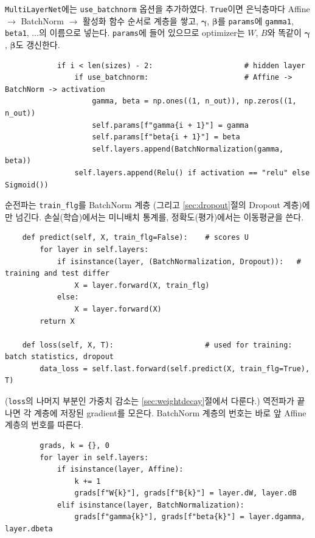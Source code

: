 \documentclass[11pt,a4paper]{article}
\begin{document}
\texttt{MultiLayerNet}에는 \texttt{use\_batchnorm} 옵션을 추가하였다.
\texttt{True}이면 은닉층마다 Affine $\to$ BatchNorm $\to$ 활성화 함수 순서로 계층을 쌓고,
$\bm\gamma$, $\bm\beta$를 \texttt{params}에 \texttt{gamma1}, \texttt{beta1}, $\ldots$의 이름으로 넣는다.
\texttt{params}에 들어 있으므로 optimizer는 $W$, $B$와 똑같이 $\bm\gamma$, $\bm\beta$도 갱신한다.
\begin{lstlisting}
            if i < len(sizes) - 2:                     # hidden layer
                if use_batchnorm:                      # Affine -> BatchNorm -> activation
                    gamma, beta = np.ones((1, n_out)), np.zeros((1, n_out))
                    self.params[f"gamma{i + 1}"] = gamma
                    self.params[f"beta{i + 1}"] = beta
                    self.layers.append(BatchNormalization(gamma, beta))
                self.layers.append(Relu() if activation == "relu" else Sigmoid())
\end{lstlisting}
순전파는 \texttt{train\_flg}를 BatchNorm 계층 (그리고 \ref{sec:dropout}절의 Dropout 계층)에만 넘긴다.
손실(학습)에서는 미니배치 통계를, 정확도(평가)에서는 이동평균을 쓴다.
\begin{lstlisting}
    def predict(self, X, train_flg=False):    # scores U
        for layer in self.layers:
            if isinstance(layer, (BatchNormalization, Dropout)):   # training and test differ
                X = layer.forward(X, train_flg)
            else:
                X = layer.forward(X)
        return X

    def loss(self, X, T):                     # used for training: batch statistics, dropout
        data_loss = self.last.forward(self.predict(X, train_flg=True), T)
\end{lstlisting}
(\texttt{loss}의 나머지 부분인 가중치 감소는 \ref{sec:weightdecay}절에서 다룬다.)
역전파가 끝나면 각 계층에 저장된 gradient를 모은다.
BatchNorm 계층의 번호는 바로 앞 Affine 계층의 번호를 따른다.
\begin{lstlisting}
        grads, k = {}, 0
        for layer in self.layers:
            if isinstance(layer, Affine):
                k += 1
                grads[f"W{k}"], grads[f"B{k}"] = layer.dW, layer.dB
            elif isinstance(layer, BatchNormalization):
                grads[f"gamma{k}"], grads[f"beta{k}"] = layer.dgamma, layer.dbeta
\end{lstlisting}
\end{document}
